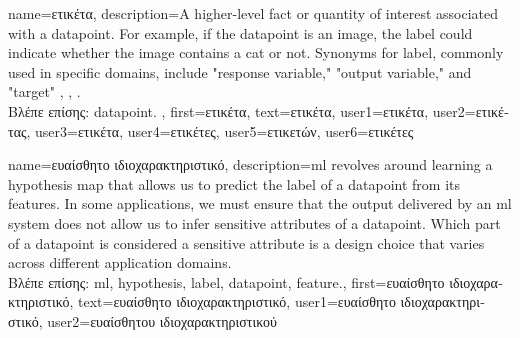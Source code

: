 {name={\foreignlanguage{greek}{ετικέτα}},
	description={A higher-level fact or quantity of interest associated with a \gls{datapoint}. 
		For example, if the \gls{datapoint} is an image, the label could indicate whether the 
		image contains a cat or not. Synonyms for label, commonly used in specific domains, 
		include "response variable," "output variable," and "target" \cite{Gujarati2021}, \cite{Dodge2003}, \cite{Everitt2022}.\\
		\foreignlanguage{greek}{Βλέπε επίσης:} \gls{datapoint}.
 },
	first={\foreignlanguage{greek}{ετικέτα}},
	text={\foreignlanguage{greek}{ετικέτα}},
	user1={\foreignlanguage{greek}{ετικέτα}}, %
  	user2={\foreignlanguage{greek}{ετικέτας}}, %
	user3={\foreignlanguage{greek}{ετικέτα}}, %
	user4={\foreignlanguage{greek}{ετικέτες}}, %
  	user5={\foreignlanguage{greek}{ετικετών}}, %
	user6={\foreignlanguage{greek}{ετικέτες}} %
}

{name={\foreignlanguage{greek}{ευαίσθητο ιδιοχαρακτηριστικό}},
	description={\gls{ml} revolves around learning a \gls{hypothesis} map that allows 
		us to predict the \gls{label} of a \gls{datapoint} from its \gls{feature}s. In some 
		applications, we must ensure that the output delivered by an \gls{ml} system does 
		not allow us to infer sensitive attributes of a \gls{datapoint}. Which part 
		of a \gls{datapoint} is considered a sensitive attribute is a design 
		choice that varies across different application domains.\\
		\foreignlanguage{greek}{Βλέπε επίσης:} \gls{ml}, \gls{hypothesis}, \gls{label}, \gls{datapoint}, \gls{feature}.},
	first={\foreignlanguage{greek}{ευαίσθητο ιδιοχαρακτηριστικό}},
	text={\foreignlanguage{greek}{ευαίσθητο ιδιοχαρακτηριστικό}},
	user1={\foreignlanguage{greek}{ευαίσθητο ιδιοχαρακτηριστικό}}, %
    	user2={\foreignlanguage{greek}{ευαίσθητου ιδιοχαρακτηριστικού}} %
}

